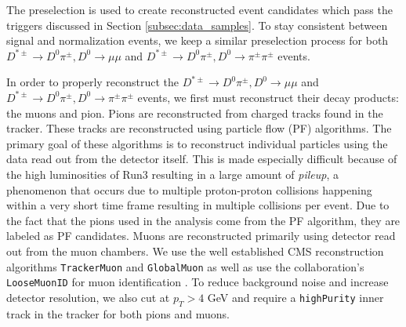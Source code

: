 The preselection is used to create reconstructed event candidates which pass the triggers discussed in Section \ref{subsec:data_samples}. To stay consistent between signal and normalization events, we keep a similar preselection process for both $D^{*\pm} \to D^0 \pi^\pm, D^0 \to \mu \mu$ and $D^{*\pm} \to D^0 \pi^\pm, D^0 \to \pi^\pm \pi^\pm$ events.

In order to properly reconstruct the $D^{*\pm} \to D^0 \pi^\pm, D^0 \to \mu \mu$ and $D^{*\pm} \to D^0 \pi^\pm, D^0 \to \pi^\pm \pi^\pm$ events, we first must reconstruct their decay products: the muons and pion. Pions are reconstructed from charged tracks found in the tracker. These tracks are reconstructed using particle flow (PF) algorithms. The primary goal of these algorithms is to reconstruct individual particles using the data read out from the detector itself. This is made especially difficult because of the high luminosities of Run3 resulting in a large amount of \textit{pileup}, a phenomenon that occurs due to multiple proton-proton collisions happening within a very short time frame resulting in multiple collisions per event. Due to the fact that the pions used in the analysis come from the PF algorithm, they are labeled as PF candidates. Muons are reconstructed primarily using detector read out from the muon chambers. We use the well established CMS reconstruction algorithms \texttt{TrackerMuon} and \texttt{GlobalMuon} as well as use the collaboration's \texttt{LooseMuonID} for muon identification \cite{ref:sirunyan_2018}. To reduce background noise and increase detector resolution, we also cut at $p_T>4$ GeV and require a \texttt{highPurity} inner track in the tracker for both pions and muons.

